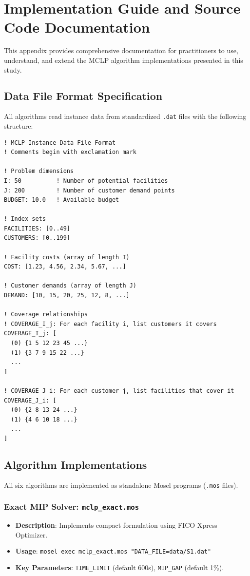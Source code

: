\documentclass[11pt,a4paper]{article}
\begin{document}
\newpage
\appendix

\section{Implementation Guide and Source Code Documentation}

This appendix provides comprehensive documentation for practitioners to use, understand, and extend the MCLP algorithm implementations presented in this study.

\subsection{Data File Format Specification}

All algorithms read instance data from standardized \texttt{.dat} files with the following structure:

\begin{lstlisting}
! MCLP Instance Data File Format
! Comments begin with exclamation mark

! Problem dimensions
I: 50          ! Number of potential facilities
J: 200         ! Number of customer demand points
BUDGET: 10.0   ! Available budget

! Index sets
FACILITIES: [0..49]
CUSTOMERS: [0..199]

! Facility costs (array of length I)
COST: [1.23, 4.56, 2.34, 5.67, ...]

! Customer demands (array of length J)
DEMAND: [10, 15, 20, 25, 12, 8, ...]

! Coverage relationships
! COVERAGE_I_j: For each facility i, list customers it covers
COVERAGE_I_j: [
  (0) {1 5 12 23 45 ...}
  (1) {3 7 9 15 22 ...}
  ...
]

! COVERAGE_J_i: For each customer j, list facilities that cover it
COVERAGE_J_i: [
  (0) {2 8 13 24 ...}
  (1) {4 6 10 18 ...}
  ...
]
\end{lstlisting}

\subsection{Algorithm Implementations}

All six algorithms are implemented as standalone Mosel programs (\texttt{.mos} files).

\subsubsection{Exact MIP Solver: \texttt{mclp\_exact.mos}}
\begin{itemize}
  \item \textbf{Description}: Implements compact formulation using FICO Xpress Optimizer.
  \item \textbf{Usage}: \texttt{mosel exec mclp\_exact.mos "DATA\_FILE=data/S1.dat"}
  \item \textbf{Key Parameters}: \texttt{TIME\_LIMIT} (default 600s), \texttt{MIP\_GAP} (default 1\%).
\end{itemize}
\end{document}
